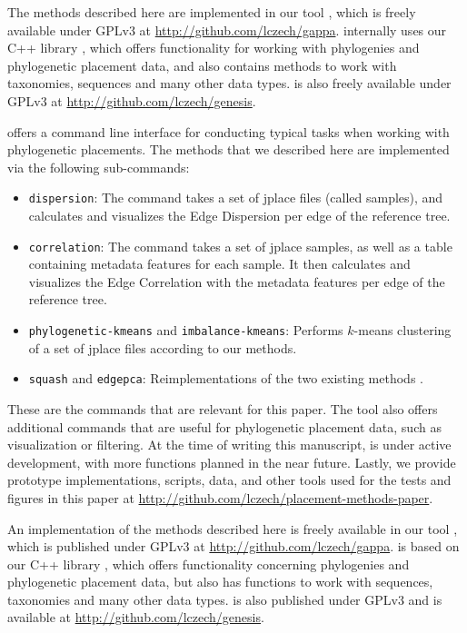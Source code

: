 
The methods described here are implemented in our tool ,
which is freely available under GPLv3 at \url{http://github.com/lczech/gappa}.
 internally uses our C++ library ,
which offers functionality for working with phylogenies and phylogenetic placement data,
and also contains methods to work with taxonomies, sequences and many other data types.
 is also freely available under GPLv3 at \url{http://github.com/lczech/genesis}.

 offers a command line interface for conducting typical tasks when working with phylogenetic placements.
The methods that we described here are implemented via the following sub-commands:

\begin{itemize}
    \item \texttt{dispersion}: The command takes a set of jplace files (called samples), and calculates and visualizes
        the Edge Dispersion per edge of the reference tree.
    \item \texttt{correlation}: The command takes a set of jplace samples, as well as a table containing metadata
        features for each sample. It then calculates and visualizes the Edge Correlation with the metadata features per
        edge of the reference tree.
    \item \texttt{phylogenetic-kmeans} and \texttt{imbalance-kmeans}: Performs $k$-means clustering of a set of jplace
        files according to our methods.
    \item \texttt{squash} and \texttt{edgepca}: Reimplementations of the two existing methods \cite{Matsen2011a,Evans2012}.
\end{itemize}

These are the  commands that are relevant for this paper.
The tool also offers additional commands that are useful for phylogenetic placement data, such as visualization or filtering.
At the time of writing this manuscript,  is under active development,
with more functions planned in the near future.
Lastly, we provide prototype implementations, scripts, data, and other tools
used for the tests and figures in this paper at \url{http://github.com/lczech/placement-methods-paper}.



An implementation of the methods described here is freely available in our tool ,
which is published under GPLv3 at \url{http://github.com/lczech/gappa}.
 is based on our C++ library ,
which offers functionality concerning phylogenies and phylogenetic placement data,
but also has functions to work with sequences, taxonomies and many other data types.
 is also published under GPLv3 and is available at \url{http://github.com/lczech/genesis}.


